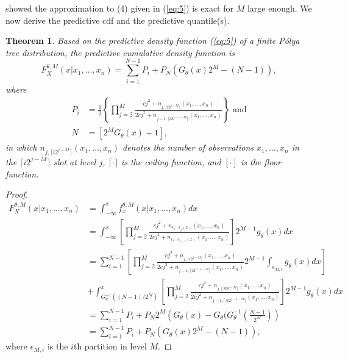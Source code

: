 \documentclass[12pt]{article}
\newtheorem{thm}{Theorem}[subsection]
\newcommand{\polya}{P\'{o}lya}
\begin{document}
\noindent \citet{hanson2002} showed the approximation to (4) given in
(\ref{eq:5}) is exact for $M$ large enough.  We now derive the
predictive cdf and the predictive quantile(s).

\begin{thm}
  Based on the predictive density function (\ref{eq:5}) of a
  finite \polya{} tree distribution, 
  the predictive cumulative density function is 
  \begin{equation}
    \label{eq:6}
    F^{\theta,M}_X(x|x_1, \ldots, x_n) = \sum_{i=1}^{N-1} P_{i} + P_N
    \left( G_{\theta}(x)2^M -(N-1) \right),
  \end{equation}
  where
  \begin{align*}
    P_i &= \frac{1}{2} \left\{\prod_{j=2}^M \frac{cj^2 + n_{j,\lceil i2^{j-M}
          \rceil}(x_1, \ldots, x_n)}{2cj^2 + n_{j-1,\lceil
          i2^{j-1-M} \rceil}(x_{1 },\ldots, x_n)} \right\} \mbox{ and}\\
    N & = \left[ 2^{M } G_{\theta}(x)   +1\right],
  \end{align*}
  in which $n_{j,\lceil i2^{j-M}
    \rceil}(x_1, \ldots, x_n)$ denotes the number of observations $x_1,
  \ldots, x_n$ in the $\lceil i2^{j-M}
  \rceil$ slot at level $j$, $\lceil \cdot
  \rceil$ is the ceiling function, and $[ \cdot ]$ is the floor function. 
\end{thm}

\begin{proof}
  \begin{align*}
    F^{\theta,M}_X(x| x_1, \ldots, x_n) & = \int_{-\infty}^x
    f_x^{\theta,M} (x|x_1, \ldots, x_n) dx \\
    & = \int_{-\infty}^x \left[
      \prod_{j=2}^M \frac{cj^2 + n_{\epsilon_1 \cdots \epsilon_j(x) }(x_1 , \ldots, x_n)}{2cj^2
        + n_{\epsilon_1 \cdots \epsilon_{j-1}(x)}(x_1, \ldots, x_n)}
    \right]2^{M-1} g_\theta(x) dx \\
    & =  \sum_{i=1}^{N-1} \left[ \prod_{j=2}^M \frac{cj^2 + n_{j, \lceil i2^{j-M}
          \rceil}(x_1,
        \ldots, x_n)}{2cj^2 + n_{j-1, \lceil i2^{j-1-M}
          \rceil}(x_1, \ldots, x_n)} 2^{M-1}
      \int_{\epsilon_{M,i}} g_{\theta}(x) dx \right] \\
    &+ 
    \int_{G^{-1}_{\theta}((N-1)/2^M)}^x \left[ \prod_{j=2}^M \frac{cj^2 + n_{j, \lceil N2^{j-M}
          \rceil}(x_1,
        \ldots, x_n)}{2cj^2 + n_{j-1, \lceil N2^{j-1-M}
          \rceil}(x_1, \ldots, x_n)}\right] 2^{M-1}
    g_{\theta}(x) dx \\
    & = \sum_{i=1}^{N-1} P_i + P_N 2^M \left( G_{\theta}(x) -
      G_{\theta}(G_{\theta}^{-1}\left( \frac{N-1}{2^M} \right)\right)\\
    & = \sum_{i=1}^{N-1}P_i + P_N \left( G_{\theta}(x) 2^M - (N-1) \right),
  \end{align*}
  where $\epsilon_{M,i}$ is the $i$th partition in level $M$. 
\end{proof}
\end{document}
